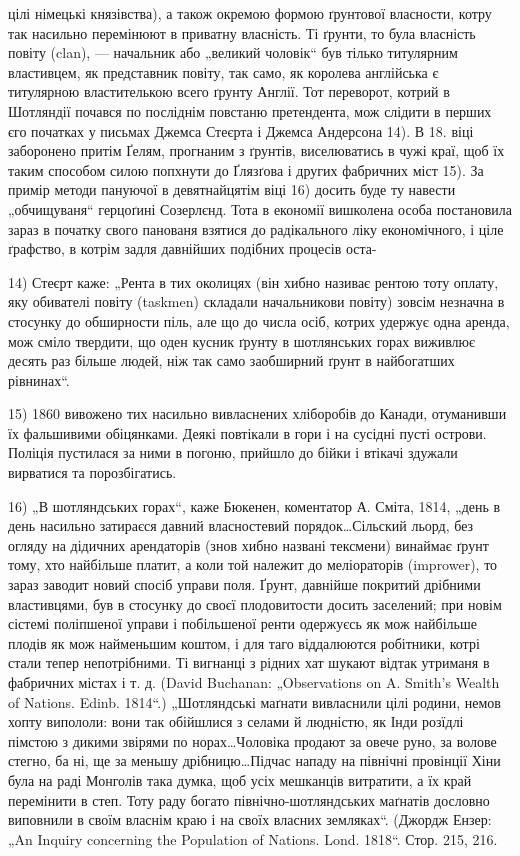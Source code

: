 цілі німецькі князівства), а також окремою формою ґрунтової власности, котру так насильно перемінюют
в приватну власність. Ті ґрунти, то була власність повіту (clan), — начальник або „великий чоловік“
був тілько титулярним властивцем, як представник повіту, так само, як королева англійська є
титулярною властителькою всего ґрунту Англії. Тот переворот, котрий в Шотляндії почався по посліднім
повстаню претендента, мож слідити в перших єго початках у письмах Джемса Стеєрта і Джемса Андерсона
14). В 18. віці заборонено притім Ґелям, прогнаним з ґрунтів, виселюватись в чужі краї, щоб їх таким
способом силою попхнути до Ґлязґова і других фабричних міст 15). За примір
методи пануючої в девятнайцятім віці 16) досить буде ту навести „обчищуваня“ герцоґині Созерлєнд.
Тота в економії вишколена особа постановила зараз в початку свого панованя взятися до радікального
ліку економічного, і ціле ґрафство, в котрім задля давнійших подібних процесів оста-

14) Стеєрт каже: „Рента в тих околицях (він хибно називає рентою тоту оплату, яку обивателі повіту
(taskmen) складали начальникови повіту) зовсім незначна в стосунку до обширности піль, але що до
числа осіб, котрих удержує одна аренда, мож сміло твердити, що оден кусник ґрунту в шотлянських
горах виживлює десять раз більше людей, ніж так само заобширний ґрунт в найбогатших рівнинах“.

15) 1860 вивожено тих насильно вивласнених хліборобів до Канади, отуманивши їх фальшивими
обіцянками. Деякі повтікали в гори і на сусідні пусті острови. Поліція пустилася за ними в погоню,
прийшло до бійки і втікачі здужали вирватися та порозбігатись.

16) „В шотляндських горах“, каже Бюкенен, коментатор А. Сміта, 1814, „день в день насильно затираєся
давний власностевий порядок\dots Сільский льорд, без огляду на дідичних арендаторів (знов хибно
названі тексмени) винаймає ґрунт тому, хто найбільше платит, а коли той належит до меліораторів
(imprower), то зараз заводит новий спосіб управи поля. Ґрунт, давнійше покритий дрібними
властивцями, був в стосунку до своєї плодовитости досить заселений; при новім сістемі поліпшеної
управи і побільшеної ренти одержуєсь як мож найбільше плодів як мож найменьшим коштом, і для таго
віддалюются робітники, котрі стали тепер непотрібними. Ті вигнанці з рідних хат шукают відтак
утриманя в фабричних містах і т. д. (David Buchanan: „Observations on A. Smith’s Wealth of Nations.
Edinb. 1814“.) „Шотляндські маґнати вивласнили цілі родини, немов хопту випололи: вони так обійшлися
з селами й людністю, як Інди розїдлі пімстою з дикими звірями по норах\dots Чоловіка продают
за овече руно, за волове стегно, ба ні, ще за меньшу дрібницю\dots Підчас нападу на північні
провінції Хіни була на раді Монголів така думка, щоб усіх мешканців витратити, а їх край перемінити
в степ. Тоту раду богато північно-шотляндських маґнатів дословно виповнили в своїм власнім краю і на
своїх власних земляках“. (Джордж Ензер: „An Inquiry concerning the Population of Nations. Lond.
1818“. Стор. 215, 216.
